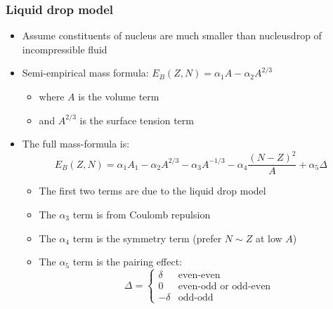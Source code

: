\subsubsection{Liquid drop model}
\begin{itemize}
  \item Assume constituents of nucleus are much smaller than nucleus\thus drop of incompressible fluid
  \item \thus Semi-empirical mass formula: $E_B(Z,N) = \alpha_1 A - \alpha_2 A^{2/3}$
  \begin{itemize}
    \item where $A$ is the volume term
    \item and $A^{2/3}$ is the surface tension term
  \end{itemize}
  \item The full mass-formula is:
  \begin{equation}
    E_B(Z,N) = \alpha_1 A_1 - \alpha_2 A^{2/3} - \alpha_3 A^{-1/3} - \alpha_4 \frac{(N-Z)^2}{A} + \alpha_5 \Delta
  \end{equation}
  \begin{itemize}
    \item The first two terms are due to the liquid drop model
    \item The $\alpha_3$ term is from Coulomb repulsion
    \item The $\alpha_4$ term is the symmetry term (prefer $N\sim Z$ at low $A$)
    \item The $\alpha_5$ term is the pairing effect:
    \begin{equation}
      \Delta = \begin{cases} \delta & \text{even-even} \\ 0 &\text{even-odd or odd-even} \\ -\delta &\text{odd-odd} \end{cases}
    \end{equation}
  \end{itemize}
\end{itemize}


